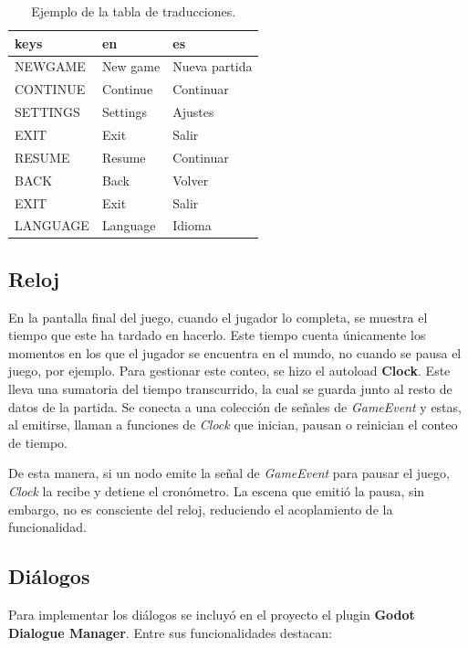\begin{table}[!ht]
    \centering
    \begin{tabular}{|l|l|l|}
    \hline
        keys & en & es \\ \hline
        NEWGAME & New game & Nueva partida \\ \hline
        CONTINUE & Continue & Continuar \\ \hline
        SETTINGS & Settings & Ajustes \\ \hline
        EXIT & Exit & Salir \\ \hline
        RESUME & Resume & Continuar \\ \hline
        BACK & Back & Volver \\ \hline
        EXIT & Exit & Salir \\ \hline
        LANGUAGE & Language & Idioma \\ \hline
    \end{tabular}
    \caption{Ejemplo de la tabla de traducciones.}
    \label{tab:localization-table}
\end{table}

\subsection{Reloj}

En la pantalla final del juego, cuando el jugador lo completa, se muestra el tiempo que este ha tardado en hacerlo. Este tiempo cuenta únicamente los momentos en los que el jugador se encuentra en el mundo, no cuando se pausa el juego, por ejemplo. Para gestionar este conteo, se hizo el autoload \textbf{Clock}. Este lleva una sumatoria del tiempo transcurrido, la cual se guarda junto al resto de datos de la partida. Se conecta a una colección de señales de \textit{GameEvent} y estas, al emitirse, llaman a funciones de \textit{Clock} que inician, pausan o reinician el conteo de tiempo.

De esta manera, si un nodo emite la señal de \textit{GameEvent} para pausar el juego, \textit{Clock} la recibe y detiene el cronómetro. La escena que emitió la pausa, sin embargo, no es consciente del reloj, reduciendo el acoplamiento de la funcionalidad.

\subsection{Diálogos}

Para implementar los diálogos se incluyó en el proyecto el plugin \textbf{Godot Dialogue Manager}. Entre sus funcionalidades destacan:

